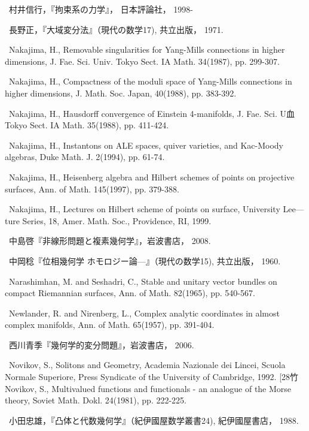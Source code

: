 {\noindent [273]\ 村井信行，『拘束系の力学』， 日本評論社， 1998-\par\smallskip
\noindent [274]\ 長野正，『大域変分法』（現代の数学17), 共立出版， 1971.\par\smallskip
\noindent [275]\ Nakajima, H., Removable singularities for Yang-Mills connections in higher dimensions, J. Fae. Sci. Univ. Tokyo Sect. IA Math. 34(1987), pp. 299-307.\par\smallskip
\noindent [276]\ Nakajima, H., Compactness of the moduli space of Yang-Mills connections in higher dimensions, J. Math. Soc. Japan, 40(1988), pp. 383-392.\par\smallskip
\noindent [277]\ Nakajima, H., Hausdorff convergence of Einstein 4-manifolds, J. Fae. Sci. U血 Tokyo Sect. IA Math. 35(1988), pp. 411-424.\par\smallskip
\noindent [278]\ Nakajima, H., Instantons on ALE spaces, quiver varieties, and Kac-Moody algebras, Duke Math. J. 2(1994), pp. 61-74.\par\smallskip
\noindent [279]\ Nakajima, H., Heisenberg algebra and Hilbert schemes of points on projective surfaces, Ann. of Math. 145(1997), pp. 379-388.\par\smallskip
\noindent [280]\ Nakajima, H., Lectures on Hilbert scheme of points on surface, University Lee— ture Series, 18, Amer. Math. Soc., Providence, RI, 1999.\par\smallskip
\noindent [281]\ 中島啓『非線形問題と複素幾何学』，岩波書店， 2008.\par\smallskip
\noindent [282]\ 中岡稔『位相幾何学 ホモロジー論—』（現代の数学15), 共立出版， 1960.\par\smallskip
\noindent [283]\ Narashimhan, M. and Seshadri, C., Stable and unitary vector bundles on compact Riemannian surfaces, Ann. of Math. 82(1965), pp. 540-567.\par\smallskip
\noindent [284]\ Newlander, R. and Nirenberg, L., Complex analytic coordinates in almost complex manifolds, Ann. of Math. 65(1957), pp. 391-404.\par\smallskip
\noindent [285]\ 西川青季『幾何学的変分問題』，岩波書店， 2006.\par\smallskip
\noindent [286]\ Novikov, S., Solitons and Geometry, Academia Nazionale dei Lincei, Scuola Normale Superiore, Press Syndicate of the University of Cambridge, 1992. [28竹 Novikov, S., Multivalued functions and functionals - an analogue of the Morse theory, Soviet Math. Dokl. 24(1981), pp. 222-225.\par\smallskip
\noindent [288]\ 小田忠雄，『凸体と代数幾何学』（紀伊國屋数学叢書24), 紀伊國屋書店， 1988.\par\smallskip
}
